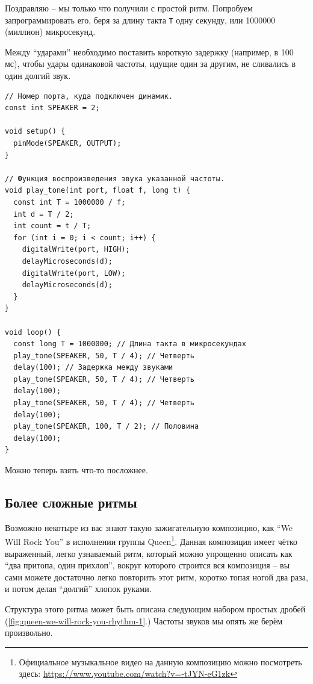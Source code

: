 \documentclass[a4paper,twoside]{book}
\begin{document}
Поздравляю -- мы только что получили с простой ритм. Попробуем запрограммировать
его, беря за длину такта \texttt{T} одну секунду, или 1000000 (миллион)
микросекунд.

Между ``ударами'' необходимо поставить короткую задержку (например, в 100 мс),
чтобы удары одинаковой частоты, идущие один за другим, не сливались в один
долгий звук.

\begin{verbatim}
// Номер порта, куда подключен динамик.
const int SPEAKER = 2;

void setup() {
  pinMode(SPEAKER, OUTPUT);
}

// Функция воспроизведения звука указанной частоты.
void play_tone(int port, float f, long t) {
  const int T = 1000000 / f;
  int d = T / 2;
  int count = t / T;
  for (int i = 0; i < count; i++) {
    digitalWrite(port, HIGH);
    delayMicroseconds(d);
    digitalWrite(port, LOW);
    delayMicroseconds(d);
  }
}

void loop() {
  const long T = 1000000; // Длина такта в микросекундах
  play_tone(SPEAKER, 50, T / 4); // Четверть
  delay(100); // Задержка между звуками
  play_tone(SPEAKER, 50, T / 4); // Четверть
  delay(100);
  play_tone(SPEAKER, 50, T / 4); // Четверть
  delay(100);
  play_tone(SPEAKER, 100, T / 2); // Половина
  delay(100);
}
\end{verbatim}

Можно теперь взять что-то посложнее.

\subsection{Более сложные ритмы}

Возможно некотыре из вас знают такую зажигательную композицию, как ``We Will
Rock You'' в исполнении группы Queen\footnote{Официальное музыкальное видео на
данную композицию можно посмотреть здесь:
\url{https://www.youtube.com/watch?v=-tJYN-eG1zk}}. Данная композиция имеет
чётко выраженный, легко узнаваемый ритм, который можно упрощенно описать как
``два притопа, один прихлоп'', вокруг которого строится вся композиция -- вы сами
можете достаточно легко повторить этот ритм, коротко топая ногой два раза, и
потом делая ``долгий'' хлопок руками.

Структура этого ритма может быть описана следующим набором простых дробей
(\ref{fig:queen-we-will-rock-you-rhythm-1}.) Частоты звуков мы опять же берём
произвольно.
\end{document}
